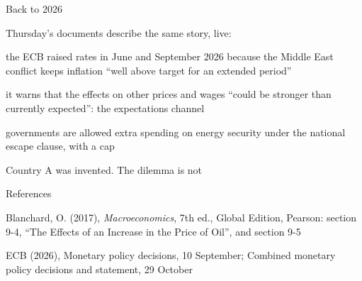 \documentclass[aspectratio=169,xcolor=table]{beamer}
\begin{document}
\begin{frame}{Back to 2026}
\small
\bi
  \item Thursday's documents describe the same story, live:
  \bi
    \item the ECB raised rates in June and September 2026 because the Middle East conflict keeps inflation ``well above target for an extended period''
    \item it warns that the effects on other prices and wages ``could be stronger than currently expected'': the expectations channel
    \item governments are allowed extra spending on energy security under the national escape clause, with a cap
  \ei
\ei
\vspace{0.1cm}
\begin{block}{}
Country A was invented. The dilemma is not
\end{block}
\end{frame}

\begin{frame}{References}
\small
\bi
  \item Blanchard, O. (2017), \textit{Macroeconomics}, 7th ed., Global Edition, Pearson: section 9-4, ``The Effects of an Increase in the Price of Oil'', and section 9-5
  \item ECB (2026), Monetary policy decisions, 10 September; Combined monetary policy decisions and statement, 29 October
\ei
\end{frame}

\pelQuestions
\end{document}
